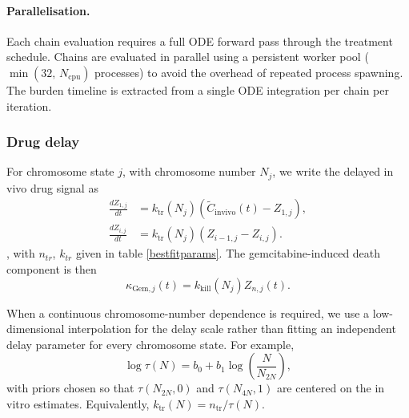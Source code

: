 \documentclass[11pt,notitlepage]{article}
\begin{document}
\paragraph{Parallelisation.}
Each chain evaluation requires a full ODE forward pass through the
treatment schedule.
Chains are evaluated in parallel using a persistent worker pool
($\min(32,\,N_{\mathrm{cpu}})$ processes) to avoid the overhead of
repeated process spawning.
The burden timeline is extracted from a single ODE integration per chain
per iteration.

\subsubsection{Drug delay}

For chromosome state \(j\), with chromosome number \(N_j\), we write the delayed in vivo drug signal as
\begin{align}
\frac{dZ_{1,j}}{dt}
&=
k_{\mathrm{tr}}(N_j)
\left(
\widetilde C_{\mathrm{in vivo}}(t)-Z_{1,j}
\right),\\
\frac{dZ_{i,j}}{dt}
&=
k_{\mathrm{tr}}(N_j)
\left(
Z_{i-1,j}-Z_{i,j}
\right).
\end{align}
, with $n_{tr}$, $k_{tr}$ given in table \ref{bestfitparams}. The gemcitabine-induced death component is then
\begin{equation}
\kappa_{\mathrm{Gem},j}(t)
=
k_{\mathrm{kill}}(N_j) Z_{n,j}(t).
\end{equation}


When a continuous chromosome-number dependence is required, we use a low-dimensional interpolation for the delay scale rather than fitting an independent delay parameter for every chromosome state. For example,
\begin{equation}
\log \tau(N)
=
b_0
+
b_1\log\left(\frac{N}{N_{2N}}\right),
\end{equation}
with priors chosen so that \(\tau(N_{2N},0)\) and \(\tau(N_{4N},1)\) are centered on the in vitro estimates. Equivalently, \(k_{\mathrm{tr}}(N)=n_{\mathrm{tr}}/\tau(N)\).


\color{black}


\clearpage
\end{document}
